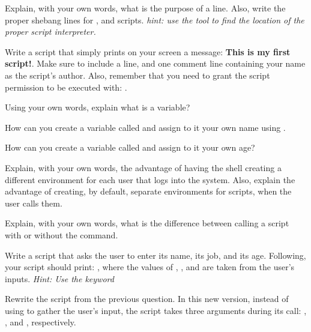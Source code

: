 \begin{exercises}
  \item Explain, with your own words, what is the purpose of a  line. Also, write the proper shebang lines for ,  and  scripts. \textit{hint: use the  tool to find the location of the proper script interpreter.}
  \item Write a  script that simply prints on your screen a message: \textbf{This is my first script!}. Make sure to include a  line, and one comment line containing your name as the script's author. Also, remember that you need to grant the script permission to be executed with: .
  \item Using your own words, explain what is a variable?
  \item How can you create a variable called  and assign to it your own name using .
  \item How can you create a variable called  and assign to it your own age?
  \item Explain, with your own words, the advantage of having the shell creating a different environment for each user that logs into the system. Also, explain the advantage of creating, by default, separate environments for scripts, when the user calls them.
  \item Explain, with your own words, what is the difference between calling a script with or without the  command.
  \item Write a script that asks the user to enter its name, its job, and its age. Following, your script should print: , where the values of , , and  are taken from the user's inputs. \textit{Hint: Use the  keyword}
  \item Rewrite the script from the previous question. In this new version, instead of using  to gather the user's input, the script takes three arguments during its call: , , and , respectively.
\end{exercises}
